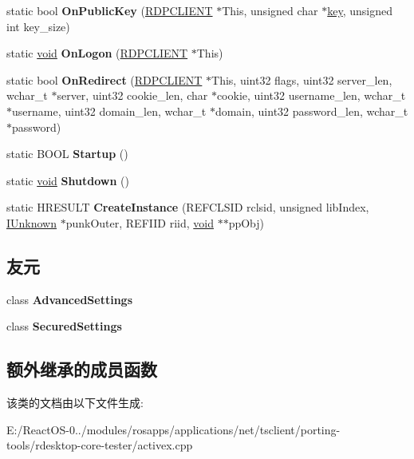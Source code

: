 \begin{DoxyCompactItemize}
\item 
\mbox{\label{class_s_e_a_l_e_d___a27c1fc516f72de3c3a21df2ca365db59}} 
static bool {\bfseries On\+Public\+Key} (\hyperlink{structrdpclient}{R\+D\+P\+C\+L\+I\+E\+NT} $\ast$This, unsigned char $\ast$\hyperlink{structkey}{key}, unsigned int key\+\_\+size)
\item 
\mbox{\label{class_s_e_a_l_e_d___aea3e5f30ca499b136f77548e8159403f}} 
static \hyperlink{interfacevoid}{void} {\bfseries On\+Logon} (\hyperlink{structrdpclient}{R\+D\+P\+C\+L\+I\+E\+NT} $\ast$This)
\item 
\mbox{\label{class_s_e_a_l_e_d___a99e8fe058b15051b0cb1db33f40eda59}} 
static bool {\bfseries On\+Redirect} (\hyperlink{structrdpclient}{R\+D\+P\+C\+L\+I\+E\+NT} $\ast$This, uint32 flags, uint32 server\+\_\+len, wchar\+\_\+t $\ast$server, uint32 cookie\+\_\+len, char $\ast$cookie, uint32 username\+\_\+len, wchar\+\_\+t $\ast$username, uint32 domain\+\_\+len, wchar\+\_\+t $\ast$domain, uint32 password\+\_\+len, wchar\+\_\+t $\ast$password)
\item 
\mbox{\label{class_s_e_a_l_e_d___a5c442406bb52052eda4bb1fca986a581}} 
static B\+O\+OL {\bfseries Startup} ()
\item 
\mbox{\label{class_s_e_a_l_e_d___a72e85bd435ceba38a3f92be26710213d}} 
static \hyperlink{interfacevoid}{void} {\bfseries Shutdown} ()
\item 
\mbox{\label{class_s_e_a_l_e_d___aa7152c1799aec6546d33cb6c4c885311}} 
static H\+R\+E\+S\+U\+LT {\bfseries Create\+Instance} (R\+E\+F\+C\+L\+S\+ID rclsid, unsigned lib\+Index, \hyperlink{interface_i_unknown}{I\+Unknown} $\ast$punk\+Outer, R\+E\+F\+I\+ID riid, \hyperlink{interfacevoid}{void} $\ast$$\ast$pp\+Obj)
\end{DoxyCompactItemize}
\subsection*{友元}
\begin{DoxyCompactItemize}
\item 
\mbox{\label{class_s_e_a_l_e_d___a5a23bf8ec39d8461d2275cb1e01de2ca}} 
class {\bfseries Advanced\+Settings}
\item 
\mbox{\label{class_s_e_a_l_e_d___ad3c13f796b5aef702929fa3b61327889}} 
class {\bfseries Secured\+Settings}
\end{DoxyCompactItemize}
\subsection*{额外继承的成员函数}


该类的文档由以下文件生成\+:\begin{DoxyCompactItemize}
\item 
E\+:/\+React\+O\+S-\/0../modules/rosapps/applications/net/tsclient/porting-\/tools/rdesktop-\/core-\/tester/activex.\+cpp\end{DoxyCompactItemize}
